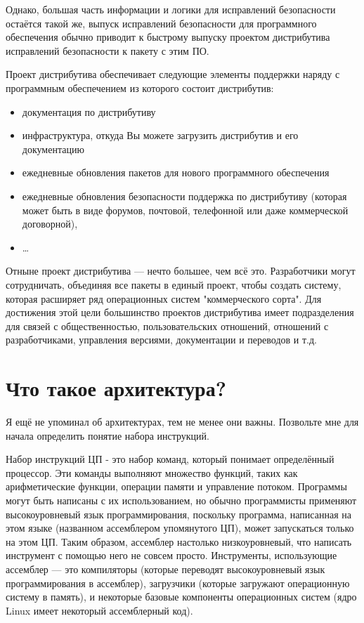 \documentclass[12pt]{book}
\begin{document}
Однако, большая часть информации и логики для исправлений безопасности остаётся такой же, выпуск исправлений безопасности для программного обеспечения обычно приводит к быстрому выпуску проектом дистрибутива исправлений безопасности к пакету с этим ПО.

Проект дистрибутива обеспечивает следующие элементы поддержки наряду с программным обеспечением из которого состоит дистрибутив:

\begin{itemize}
	\item документация по дистрибутиву
	\item инфраструктура, откуда Вы можете загрузить дистрибутив и его документацию
	\item ежедневные обновления пакетов для нового программного обеспечения
	\item ежедневные обновления безопасности
поддержка по дистрибутиву (которая может быть в виде форумов, почтовой, телефонной или даже коммерческой договорной),
 \item \ldots
\end{itemize}

Отныне проект дистрибутива — нечто большее, чем всё это. Разработчики могут сотрудничать, объединяя все пакеты в единый проект, чтобы создать  систему, которая расширяет ряд операционных систем "коммерческого сорта". Для достижения этой цели большинство проектов дистрибутива имеет подразделения для связей с общественностью, пользовательских отношений, отношений с разработчиками, управления версиями, документации и переводов и т.д.

\section{Что такое архитектура?}

Я ещё не упоминал об архитектурах, тем не менее они важны. Позвольте мне для начала определить понятие набора инструкций.

Набор инструкций ЦП - это набор команд, который понимает определённый процессор. Эти команды выполняют множество функций, таких как арифметические функции, операции памяти и управление потоком. Программы могут быть написаны с их использованием, но обычно программисты применяют высокоуровневый язык программирования, поскольку  программа, написанная на этом языке (названном ассемблером упомянутого ЦП), может запускаться только на этом ЦП. Таким образом, ассемблер настолько низкоуровневый, что написать инструмент с помощью него не совсем просто. Инструменты, использующие ассемблер — это компиляторы (которые переводят высокоуровневый язык программирования в ассемблер), загрузчики (которые загружают операционную систему в память), и некоторые базовые компоненты операционных систем (ядро Linux имеет некоторый ассемблерный код).
\end{document}
